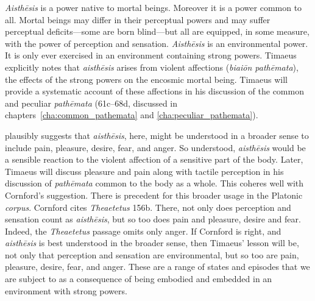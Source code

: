 \emph{Aisthēsis} is a power native to mortal beings. Moreover it is a power common to all. Mortal beings may differ in their perceptual powers and may suffer perceptual deficits---some are born blind---but all are equipped, in some measure, with the power of perception and sensation. \emph{Aisthēsis} is an environmental power. It is only ever exercised in an environment containing strong powers. Timaeus explicitly notes that \emph{aisthēsis} arises from violent affections (\emph{biaiōn pathēmata}), the effects of the strong powers on the encosmic mortal being. Timaeus will provide a systematic account of these affections in his discussion of the common and peculiar \emph{pathēmata} (61c--68d, discussed in chapters~\ref{cha:common_pathemata} and \ref{cha:peculiar_pathemata}).

\citet[143 n2]{Cornford:1935fk} plausibly suggests that \emph{aisthēsis}, here, might be understood in a broader sense to include pain, pleasure, desire, fear, and anger. So understood, \emph{aisthēsis} would be a sensible reaction to the violent affection of a sensitive part of the body. Later, Timaeus will discuss pleasure and pain along with tactile perception in his discussion of \emph{pathēmata} common to the body as a whole. This coheres well with Cornford's suggestion. There is precedent for this broader usage in the Platonic \emph{corpus}. Cornford cites \emph{Theaetetus} 156b. There, not only does perception and sensation count as \emph{aisthēsis}, but so too does pain and pleasure, desire and fear. Indeed, the \emph{Theaetetus} passage omits only anger. If Cornford is right, and \emph{aisthēsis} is best understood in the broader sense, then Timaeus' lesson will be, not only that perception and sensation are environmental, but so too are pain, pleasure, desire, fear, and anger. These are a range of states and episodes that we are subject to as a consequence of being embodied and embedded in an environment with strong powers.

